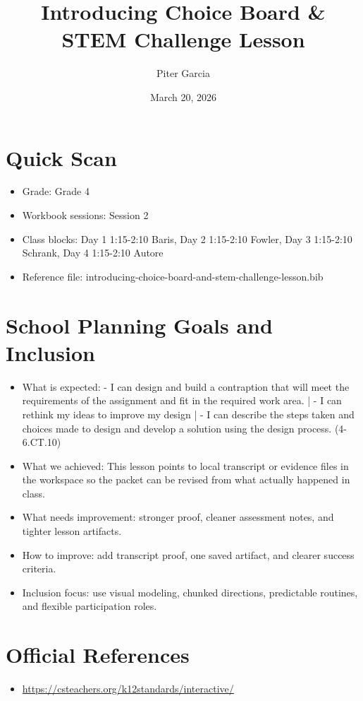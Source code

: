 \documentclass[11pt]{article}
\title{Introducing Choice Board & STEM Challenge Lesson}
\author{Piter Garcia}
\date{March 20, 2026}
\begin{document}
\maketitle
\section*{Quick Scan}
\begin{itemize}[leftmargin=*]
\item Grade: Grade 4
\item Workbook sessions: Session 2
\item Class blocks: Day 1 1:15-2:10 Baris, Day 2 1:15-2:10 Fowler, Day 3 1:15-2:10 Schrank, Day 4 1:15-2:10 Autore
\item Reference file: introducing-choice-board-and-stem-challenge-lesson.bib
\end{itemize}
\section*{School Planning Goals and Inclusion}
\begin{itemize}[leftmargin=*]
\item What is expected: - I can design and build a contraption that will meet the requirements of the assignment and fit in the required work area. | - I can rethink my ideas to improve my design | - I can describe the steps taken and choices made to design and develop a solution using the design process. (4-6.CT.10)
\item What we achieved: This lesson points to local transcript or evidence files in the workspace so the packet can be revised from what actually happened in class.
\item What needs improvement: stronger proof, cleaner assessment notes, and tighter lesson artifacts.
\item How to improve: add transcript proof, one saved artifact, and clearer success criteria.
\item Inclusion focus: use visual modeling, chunked directions, predictable routines, and flexible participation roles.
\end{itemize}
\section*{Official References}
\begin{itemize}[leftmargin=*]
\item \url{https://csteachers.org/k12standards/interactive/}

\end{itemize}
\end{document}
